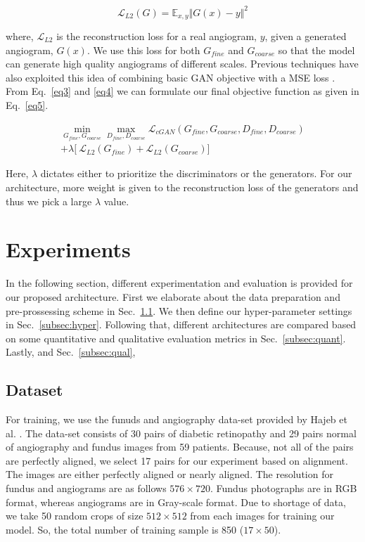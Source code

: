 \documentclass[runningheads]{llncs}
\begin{document}
\begin{equation}
    \mathcal{L}_{L2}(G) = \mathbb{E}_{x,y} \Vert G(x) - y \Vert^2
    \label{eq4}
\end{equation}

where, $\mathcal{L}_{L2}$ is the reconstruction loss for a real angiogram, $y$, given a generated angiogram, $G(x)$. We use this loss for both $G_{fine}$ and $G_{coarse}$ so that the model can generate high quality angiograms of different scales. Previous techniques have also exploited this idea of combining basic GAN objective with a MSE loss \cite{pathak2016context}. From Eq.~\ref{eq3} and \ref{eq4} we can formulate our final objective function as given in Eq.~\ref{eq5}.

\begin{equation}
\begin{split}
    \min \limits_{G_{fine},G_{coarse}} \max \limits_{D_{fine},D_{coarse}}  \mathcal{L}_{cGAN}(G_{fine},G_{coarse}, D_{fine},D_{coarse}) \\+ \lambda\big[\ \mathcal{L}_{L2}(G_{fine}) + \mathcal{L}_{L2}(G_{coarse})\big]\
    \label{eq5}
\end{split}
\end{equation}

Here, $\lambda$ dictates either to prioritize the discriminators or the generators. For our architecture, more weight is given to the reconstruction loss of the generators and thus we pick a large $\lambda$ value.




\section{Experiments}\label{sec:Results}

In the following section, different experimentation and evaluation is provided for our proposed architecture. First we elaborate about the data preparation and pre-prossessing scheme in Sec.~\ref{subsec:dataset}. We then define our hyper-parameter settings in Sec.~\ref{subsec:hyper}. Following that, different architectures are compared based on some quantitative and qualitative evaluation metrics in Sec.~\ref{subsec:quant}. Lastly, and Sec.~\ref{subsec:qual},

\subsection{Dataset}\label{subsec:dataset}
For training, we use the funuds and angiography data-set provided by Hajeb et al. \cite{hajeb2012diabetic}. The data-set consists of 30 pairs of diabetic retinopathy and 29 pairs normal of angiography and fundus images from 59 patients. Because, not all of the pairs are perfectly aligned, we select 17 pairs for our experiment based on alignment. The images are either perfectly aligned or nearly aligned. The resolution for fundus and angiograms are as follows $576\times720$. Fundus photographs are in RGB format, whereas angiograms are in Gray-scale format. Due to shortage of data, we take 50 random crops of size $512\times512$ from each images for training our model. So, the total number of training sample is 850 ($17\times50$). 
\end{document}
